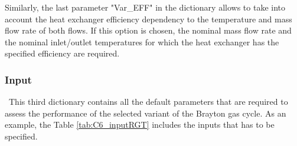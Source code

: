 Similarly, the last parameter "Var\_EFF" in the dictionary allows to take into account the heat exchanger efficiency dependency to the temperature and mass flow rate of both flows. If this option is chosen, the nominal mass flow rate and the nominal inlet/outlet temperatures for which the heat exchanger has the specified efficiency are required.

\subsubsection{Input}
\quad\ This third dictionary contains all the default parameters that are required to assess the performance of the selected variant of the Brayton gas cycle. As an example, the Table \ref{tab:C6_inputRGT} includes the inputs that has to be specified.

\begin{longtable}[c]{@{}llc@{}}


\end{longtable}
